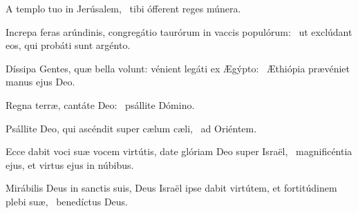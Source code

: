 \item A templo tuo in Jerúsalem,~\psstar{} tibi ófferent reges múnera.

\item Increpa feras arúndinis, congregátio taurórum in vaccis populórum:~\psstar{} ut exclúdant eos, qui probáti sunt argénto.

\item Díssipa Gentes, quæ bella volunt: vénient legáti ex Ægýpto:~\psstar{} Æthiópia prævéniet manus ejus Deo.

\item Regna terræ, cantáte Deo:~\psstar{} psállite Dómino.

\item Psállite Deo, qui ascéndit super cælum cæli,~\psstar{} ad Oriéntem.

\item Ecce dabit voci suæ vocem virtútis, date glóriam Deo super Israël,~\psstar{} magnificéntia ejus, et virtus ejus in núbibus.

\item Mirábilis Deus in sanctis suis, Deus Israël ipse dabit virtútem, et fortitúdinem plebi suæ,~\psstar{} benedíctus Deus.

